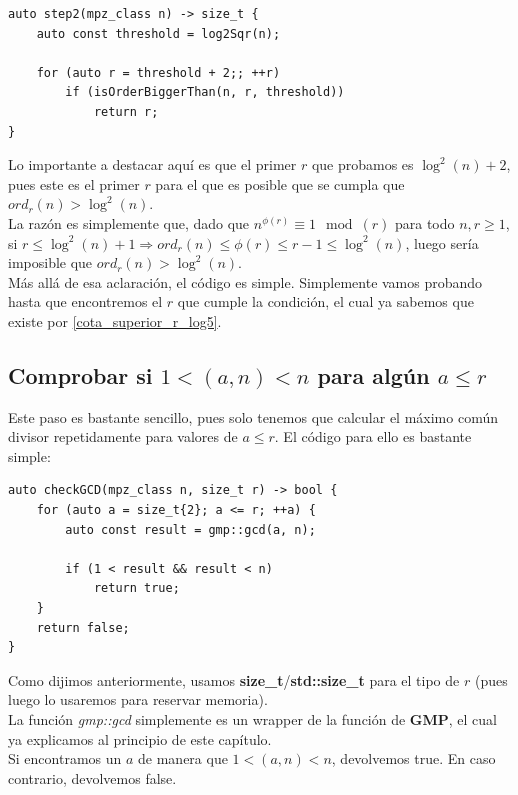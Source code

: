 \begin{lstlisting}
auto step2(mpz_class n) -> size_t {
	auto const threshold = log2Sqr(n);
	
	for (auto r = threshold + 2;; ++r)
		if (isOrderBiggerThan(n, r, threshold))
			return r;
}
\end{lstlisting}

Lo importante a destacar aquí es que el primer $r$ que probamos es $\log^2(n) + 2$, pues este es el primer $r$ para el que es posible que se cumpla que $ord_r(n) > \log^2(n)$.\\

La razón es simplemente que, dado que $n^{\phi(r)} \equiv 1 \mod(r)$ para todo $n, r \geq 1$, si $r \leq \log^2(n) + 1 \Rightarrow ord_r(n) \leq \phi(r) \leq r - 1 \leq \log^2(n)$, luego sería imposible que $ord_r(n) > \log^2(n)$.\\

Más allá de esa aclaración, el código es simple. Simplemente vamos probando hasta que encontremos el $r$ que cumple la condición, el cual ya sabemos que existe por \autoref{cota_superior_r_log5}.

\subsection{Comprobar si $1 < (a, n) < n$ para algún $a \leq r$}

Este paso es bastante sencillo, pues solo tenemos que calcular el máximo común divisor repetidamente para valores de $a \leq r$. El código para ello es bastante simple:\\

\begin{lstlisting}
auto checkGCD(mpz_class n, size_t r) -> bool {
	for (auto a = size_t{2}; a <= r; ++a) {
		auto const result = gmp::gcd(a, n);
	
		if (1 < result && result < n)
			return true;
	}
	return false;
}
\end{lstlisting}

Como dijimos anteriormente, usamos \textbf{size\_t}/\textbf{std::size\_t} para el tipo de $r$ (pues luego lo usaremos para reservar memoria).\\

La función \textit{gmp::gcd} simplemente es un wrapper de la función de \textbf{GMP}, el cual ya explicamos al principio de este capítulo.\\

Si encontramos un $a$ de manera que $1 < (a, n) < n$, devolvemos true. En caso contrario, devolvemos false.

